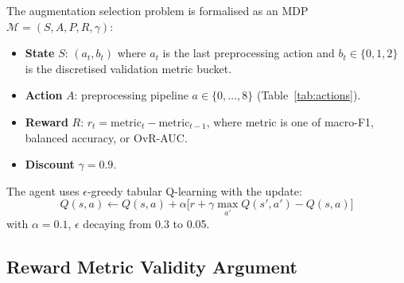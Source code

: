 \documentclass[runningheads]{llncs}
\begin{document}
%
%
%
%
%

The augmentation selection problem is formalised as an MDP
$\mathcal{M} = (S, A, P, R, \gamma)$:

\begin{itemize}
  \item \textbf{State} $S$: $(a_t, b_t)$ where $a_t$ is the last
        preprocessing action and $b_t \in \{0,1,2\}$ is the
        discretised validation metric bucket.
  \item \textbf{Action} $A$: preprocessing pipeline $a \in \{0,\ldots,8\}$
        (Table~\ref{tab:actions}).
  \item \textbf{Reward} $R$: $r_t = \text{metric}_t - \text{metric}_{t-1}$,
        where metric is one of macro-F1, balanced accuracy, or OvR-AUC.
  \item \textbf{Discount} $\gamma = 0.9$.
\end{itemize}

The agent uses $\epsilon$-greedy tabular Q-learning with the update:
\begin{equation}
  Q(s,a) \leftarrow Q(s,a) + \alpha
  \bigl[r + \gamma \max_{a'} Q(s',a') - Q(s,a)\bigr]
\end{equation}
with $\alpha=0.1$, $\epsilon$ decaying from 0.3 to 0.05.

\subsection{Reward Metric Validity Argument}

\end{document}
